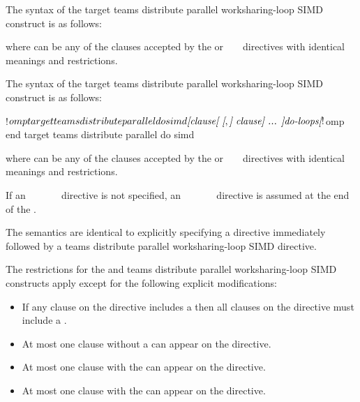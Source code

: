 \syntax
\begin{ccppspecific}
The syntax of the target teams distribute parallel worksharing-loop SIMD construct is as follows:

\begin{ompcPragma}
#pragma omp target teams distribute parallel for simd \plc{\}
            \plc{[clause[ [},\plc{] clause] ... ] new-line}
    \plc{for-loops}
\end{ompcPragma}

where  can be any of the clauses accepted by the  or
~  ~
directives with identical meanings and restrictions.
\end{ccppspecific}

\begin{fortranspecific}
The syntax of the target teams distribute parallel worksharing-loop SIMD construct is as follows:

\begin{ompfPragma}
!$omp target teams distribute parallel do simd \plc{[clause[ [},\plc{] clause] ... ]}
    \plc{do-loops}
\plc{[}!$omp end target teams distribute parallel do simd\plc{]}
\end{ompfPragma}

where  can be any of the clauses accepted by the
 or ~  ~
directives with identical meanings and restrictions.

If an ~~~~~~
directive is not specified, an
~~~~~~
directive is assumed at the end of the .
\end{fortranspecific}

\descr
The semantics are identical to explicitly specifying a 
directive immediately followed by a teams distribute parallel worksharing-loop
SIMD directive. 


\restrictions
The restrictions for the  and teams distribute parallel
worksharing-loop SIMD constructs apply except for the following explicit modifications:

\begin{itemize}
\item If any  clause on the directive includes a
       then all  clauses
      on the directive must include a .

\item At most one  clause without a
       can appear on the directive.

\item At most one  clause with the 
       can appear on the directive.

\item At most one  clause with the 
       can appear on the directive.
  \end{itemize}

